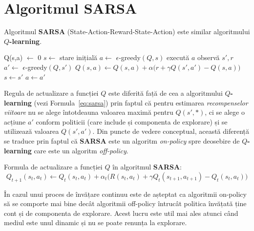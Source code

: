 \documentclass[12pt]{article}
\newcommand{\sarsa}{{\color{blue(pigment)} \textbf{SARSA}}}
\newcommand{\qlearn}{{\color{blue(pigment)} $Q$\textbf{-learning}}}
\begin{document}
\section{Algoritmul SARSA}
\label{sec:sarsa-alg}


Algoritmul \sarsa{} (State-Action-Reward-State-Action)
\citep{rummery1994line,singh1996reinforcement} este similar
algoritmului \qlearn{}.

\begin{algorithm}
  \caption{Algoritmul SARSA}
  \begin{algorithmic}[1]
      \STATE Q(s,a)
    $\longleftarrow$ 0
    \ENDFOR
    \ENDFOR
     \STATE $s \longleftarrow$ stare inițială
    \STATE $a \longleftarrow$ $\epsilon$-greedy$(Q,s)$ \REPEAT \STATE
    execută $a$ \STATE observă $s',r$ \STATE $a' \longleftarrow$
    $\epsilon$-greedy$(Q,s')$ \STATE $Q(s,a) \longleftarrow Q(s,a) +
    \alpha \Big( r + \gamma Q(s',a') - Q(s,a) \Big)$ \STATE $s
    \longleftarrow s'$ \STATE $a \longleftarrow a'$ 
    \ENDFOR
  \end{algorithmic}
  \label{algsarsa}
\end{algorithm}

Regula de actualizare a funcției $Q$ este diferită față de cea a
algoritmului \qlearn{} (vezi Formula~\ref{eq:sarsa}) prin faptul că
pentru estimarea \emph{recompenselor viitoare} nu se alege întotdeauna
valoarea maximă pentru $Q(s',*)$, ci se alege o acțiune $a'$ conform
politicii (care include și componenta de explorare) și se utilizează
valoarea $Q(s',a')$. Din puncte de vedere conceptual, această
diferență se traduce prin faptul că \sarsa{} este un algoritm
\emph{on-policy} spre deosebire de \qlearn{} care este un algoritm
\emph{off-policy}.

Formula de actualizare a funcției $Q$ în algoritmul \sarsa{}:
\begin{equation}
  \label{eq:sarsa}
  Q_{t+1}(s_{t},a_{t}) \longleftarrow Q_{t}(s_{t},a_{t}) +
  \alpha_t \Big(R(s_{t},a_{t}) +
  \gamma Q_{t}(s_{t+1},a_{t+1})-Q_{t}(s_{t},a_{t})\Big)
\end{equation}

În cazul unui proces de învățare continuu este de așteptat ca
algoritmii on-policy să se comporte mai bine decât algoritmii
off-policy întrucât politica învățată ține cont și de componenta de
explorare. Acest lucru este util mai ales atunci când mediul este unul
dinamic și nu se poate renunța la explorare.
\end{document}
